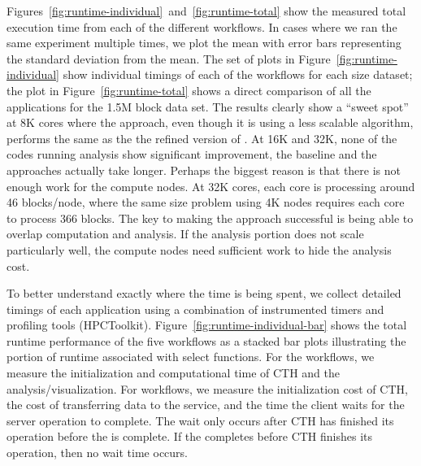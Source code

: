 Figures~\ref{fig:runtime-individual}~and~\ref{fig:runtime-total} show the
measured total execution time from each of the different workflows.  In cases
where we ran the same experiment multiple times, we plot the mean with error
bars representing the standard deviation from the mean. The set of plots in
Figure~\ref{fig:runtime-individual} show individual timings of each of the
workflows for each size dataset; the plot  in Figure~\ref{fig:runtime-total}
shows a direct comparison of all the  applications for the 1.5M block data set.
The results clearly show a ``sweet spot'' at 8K cores where the \intransit
approach, even though it is using a less scalable algorithm, performs the same
as the the refined version of \insitu.  At 16K and 32K, none of the codes
running analysis show significant improvement, the baseline \insitu and the
\intransit approaches actually take longer.  Perhaps the biggest reason is that
there is not enough work for the compute nodes.  At 32K cores, each core is
processing around 46 blocks/node, where the same size problem using 4K
nodes requires each core to process 366 blocks.  The key to making the
\intransit approach successful is being able to overlap computation and
analysis.  If the analysis portion does not scale particularly well, the
compute nodes need sufficient work to hide the analysis cost.


To better understand exactly where the time is being spent, we collect
detailed timings of each application using a combination of instrumented timers
and profiling tools (HPCToolkit).  Figure~\ref{fig:runtime-individual-bar} shows
the total runtime performance of the five workflows as a stacked bar plots
illustrating the portion of runtime associated with select functions.  For the
\insitu workflows, we measure the initialization and computational time of
CTH and the analysis/visualization.  For \intransit workflows, we measure
the initialization cost of CTH, the cost of transferring data to the service,
and the time the client waits for the server operation to complete. The wait
only occurs after CTH has finished its operation before the \vda is
complete.  If the \vda completes before CTH finishes its operation, then no
wait time occurs.

